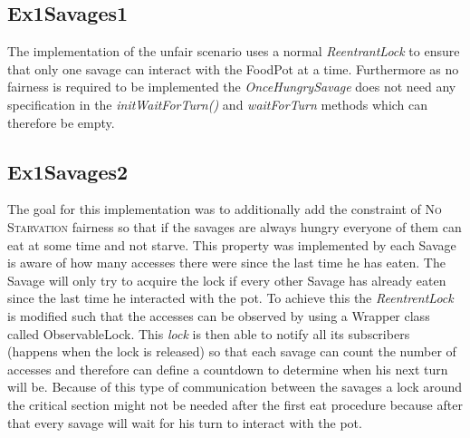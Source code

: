 \documentclass{article}
\begin{document}
\begin{adjustwidth}{2em}{2em}
		\subsection{Ex1Savages1}
		\begin{adjustwidth}{2em}{2em}
			The implementation of the unfair scenario uses a normal \textit{ReentrantLock} to ensure that only one savage can interact with the FoodPot at a time. Furthermore as no fairness is required to be implemented the \textit{OnceHungrySavage} does not need any specification in the \textit{initWaitForTurn()} and \textit{waitForTurn} methods which can therefore be empty.
		\end{adjustwidth}
		\subsection{Ex1Savages2}
		\begin{adjustwidth}{2em}{2em}
			The goal for this implementation was to additionally add the constraint of \textsc{No Starvation} fairness so that if the savages are always hungry everyone of them can eat at some time and not starve. This property was implemented by each Savage is aware of how many accesses there were since the last time he has eaten. The Savage will only try to acquire the lock if every other Savage has already eaten since the last time he interacted with the pot. To achieve this the \textit{ReentrentLock} is modified such that the accesses can be observed by using a Wrapper class called ObservableLock. This \textit{lock} is then able to notify all its subscribers (happens when the lock is released) so that each savage can count the number of accesses and therefore can define a countdown to determine when his next turn will be. Because of this type of communication between the savages a lock around the critical section might not be needed after the first eat procedure because after that every savage will wait for his turn to interact with the pot.
		\end{adjustwidth}
	\end{adjustwidth}
\end{document}
